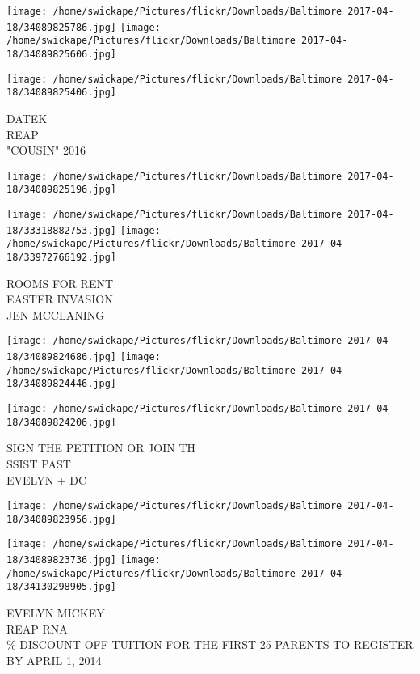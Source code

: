 \documentclass[10pt,letterpaper]{article}
\begin{document}
\texttt{[image: /home/swickape/Pictures/flickr/Downloads/Baltimore 2017-04-18/34089825786.jpg]}
\texttt{[image: /home/swickape/Pictures/flickr/Downloads/Baltimore 2017-04-18/34089825606.jpg]}

\vspace{0.25in}
\texttt{[image: /home/swickape/Pictures/flickr/Downloads/Baltimore 2017-04-18/34089825406.jpg]}

DATEK\\
REAP\\
"COUSIN" 2016\\
\pagebreak

\texttt{[image: /home/swickape/Pictures/flickr/Downloads/Baltimore 2017-04-18/34089825196.jpg]}

\vspace{0.25in}
\texttt{[image: /home/swickape/Pictures/flickr/Downloads/Baltimore 2017-04-18/33318882753.jpg]}
\texttt{[image: /home/swickape/Pictures/flickr/Downloads/Baltimore 2017-04-18/33972766192.jpg]}

ROOMS FOR RENT\\
EASTER INVASION\\
JEN MCCLANING\\
\pagebreak

\texttt{[image: /home/swickape/Pictures/flickr/Downloads/Baltimore 2017-04-18/34089824686.jpg]}
\texttt{[image: /home/swickape/Pictures/flickr/Downloads/Baltimore 2017-04-18/34089824446.jpg]}

\texttt{[image: /home/swickape/Pictures/flickr/Downloads/Baltimore 2017-04-18/34089824206.jpg]}

SIGN THE PETITION OR JOIN TH\\
SSIST PAST\\
EVELYN + DC\\
\pagebreak

\texttt{[image: /home/swickape/Pictures/flickr/Downloads/Baltimore 2017-04-18/34089823956.jpg]}

\vspace{0.25in}
\texttt{[image: /home/swickape/Pictures/flickr/Downloads/Baltimore 2017-04-18/34089823736.jpg]}
\texttt{[image: /home/swickape/Pictures/flickr/Downloads/Baltimore 2017-04-18/34130298905.jpg]}

EVELYN MICKEY\\
REAP RNA\\
\% DISCOUNT OFF TUITION FOR THE FIRST 25 PARENTS TO REGISTER BY APRIL 1, 2014\\
\pagebreak
\end{document}

